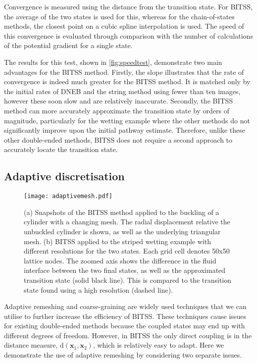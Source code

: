 \documentclass[twocolumn,10pt]{revtex4}
\begin{document}
Convergence is measured using the distance from the transition state.
For BITSS, the average of the two states is used for this, whereas for the chain-of-states methods, the closest point on a cubic spline interpolation is used.
The speed of this convergence is evaluated through comparison with the number of calculations of the potential gradient for a single state.

The results for this test, shown in \cref{fig:speedtest}, demonstrate two main advantages for the BITSS method.
Firstly, the slope illustrates that the rate of convergence is indeed much greater for the BITSS method.
It is matched only by the initial rates of DNEB and the string method using fewer than ten images, however these soon slow and are relatively inaccurate.
Secondly, the BITSS method can more accurately approximate the transition state by orders of magnitude, particularly for the wetting example where the other methods do not significantly improve upon the initial pathway estimate.
Therefore, unlike these other double-ended methods, BITSS does not require a second approach to accurately locate the transition state.


\subsection{Adaptive discretisation}
\label{sec:adaptive}
\begin{figure}[tb]
  \texttt{[image: adaptivemesh.pdf]}
  \caption{\label{fig:adaptivemesh}
    (a) Snapshots of the BITSS method applied to the buckling of a cylinder with a changing mesh.
        The radial displacement relative the unbuckled cylinder is shown, as well as the underlying triangular mesh.
    (b) BITSS applied to the striped wetting example with different resolutions for the two states.
        Each grid cell denotes 50x50 lattice nodes.
        The zoomed axis shows the difference in the fluid interface between the two final states, as well as the approximated transition state (solid black line).
        This is compared to the transition state found using a high resolution (dashed line).
  }
\end{figure}

Adaptive remeshing and coarse-graining are widely used techniques that we can utilise to further increase the efficiency of BITSS.
These techniques cause issues for existing double-ended methods because the coupled states may end up with different degrees of freedom.
However, in BITSS the only direct coupling is in the distance measure, $\mathrm{d}(\bm{x}_1,\bm{x}_2)$, which is relatively easy to adapt.
Here we demonstrate the use of adaptive remeshing by considering two separate issues.
\end{document}
